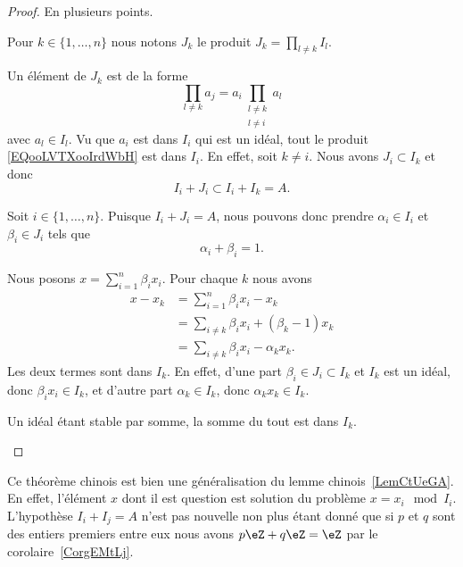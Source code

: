 \begin{proof}
	En plusieurs points.
	\begin{subproof}
		\spitem[Définition de \( J_k\)]

		Pour \( k\in\{ 1,\ldots,n \}\) nous notons \( J_k\) le produit \( J_k=\prod_{l\neq k}I_l\).

		Un élément de \( J_k\) est de la forme
		\begin{equation}        \label{EQooLVTXooIrdWbH}
			\prod_{l\neq k}a_j=a_i\prod_{\substack{l\neq k\\l\neq i}}a_l
		\end{equation}
		avec \( a_l\in I_l\). Vu que \( a_i\) est dans \( I_i\) qui est un idéal, tout le produit \eqref{EQooLVTXooIrdWbH} est dans \( I_i\).
		\spitem[\( I_i+J_i=A\)]
		En effet, soit \( k\neq i\). Nous avons \( J_i\subset  I_k\) et donc
		\begin{equation}
			I_i+J_i\subset I_i+I_k=A.
		\end{equation}


		Soit \( i\in \{ 1,\ldots, n \}\). Puisque \( I_i+J_i=A\), nous pouvons donc prendre \( \alpha_i\in I_i\) et \( \beta_i\in J_i\) tels que
		\begin{equation}
			\alpha_i+\beta_i = 1.
		\end{equation}

		\spitem[Et enfin]
		Nous posons \( x=\sum_{i=1}^n\beta_ix_i\). Pour chaque \( k\) nous avons
		\begin{subequations}
			\begin{align}
				x-x_k & =\sum_{i=1}^n\beta_ix_i-x_k              \\
				      & =\sum_{i\neq k}\beta_ix_i+(\beta_k-1)x_k \\
				      & =\sum_{i\neq k}\beta_ix_i-\alpha_kx_k.
			\end{align}
		\end{subequations}
		Les deux termes sont dans \( I_k\). En effet, d'une part \( \beta_i\in J_i\subset I_k\) et \( I_k\) est un idéal, donc \( \beta_ix_i\in I_k\), et d'autre part \( \alpha_k\in I_k\), donc \( \alpha_kx_k\in I_k\).

		Un idéal étant stable par somme, la somme du tout est dans \( I_k\).
	\end{subproof}
\end{proof}

\begin{remark}
	Ce théorème chinois est bien une généralisation du lemme chinois~\ref{LemCtUeGA}. En effet, l'élément \( x\) dont il est question est solution du problème \( x=x_i\mod I_i\). L'hypothèse \( I_i+I_j=A\) n'est pas nouvelle non plus étant donné que si \( p\) et \( q\) sont des entiers premiers entre eux nous avons \( p\eZ+q\eZ=\eZ\) par le corolaire~\ref{CorgEMtLj}.
\end{remark}

